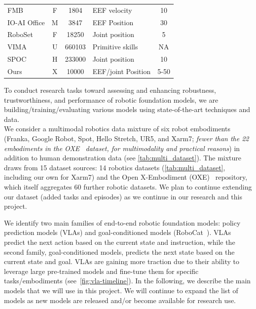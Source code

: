 \begin{table}
{\begin{tabular}{p{4cm}ccp{4cm}c}
FMB \cite{luo2024fmb}                           & F        & 1804        & EEF velocity                           & 10                                                  \\
IO-AI Office \cite{9}    & M        & 3847        & EEF Position                           & 30                                                       \\
RoboSet\cite{bharadhwaj2023roboagent}                     & F        & 18250       & Joint position                         & 5                                        \\
VIMA \cite{jiang2023vima}                        & U          & 660103      & Primitive skills                       & NA                                               \\
SPOC \cite{spoc2023}                       & H & 233000      & Joint position                         & 10                                                     \\
Ours & X & 10000 & EEF/joint Position & 5-50 \\
\bottomrule
\end{tabular}}\vspace{-2ex}
\end{table}
To conduct research tasks toward assessing and enhancing robustness, trustworthiness, and performance of robotic foundation models, we are  building/training/evaluating various models using state-of-the-art techniques and \xot data.\\
 We consider a multimodal robotics data mixture of
six robot embodiments (Franka, Google Robot, Spot, Hello Stretch, UR5, and Xarm7; \textit{fewer than the 22 embodiments in the OXE~\cite{9} dataset, for multimodality and practical reasons}) in addition to human demonstration data (see \autoref{tab:multi_dataset}). The mixture draws from 15 dataset sources: 14 robotics datasets (\autoref{tab:multi_dataset}, including our own for Xarm7) and the Open X-Embodiment (OXE)~\cite{9} repository, which itself aggregates 60 further robotic datasets.
We plan to continue extending our dataset (\ie added tasks and episodes) as we continue in our research and this project. 



We identify two main families of end-to-end robotic foundation models: policy prediction models (\eg VLAs) and goal-conditioned models (\eg RoboCat~\cite{bousmalis2023robocat}). VLAs predict the next action based on the current state and instruction, while the second family, goal-conditioned models, predicts the next state based on the current state and goal. VLAs are gaining more traction due to their ability to leverage large pre-trained models and fine-tune them for specific tasks/embodiments (see~\autoref{fig:vla-timeline}).
{In the following, we describe the main models that we will use in this project. We will continue to expand the list of models as new models are released and/or become available for research use.}


